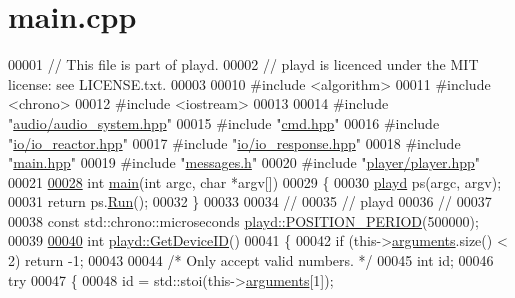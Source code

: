 \hypertarget{main_8cpp_source}{\section{main.\+cpp}
\label{main_8cpp_source}
}

\begin{DoxyCode}
00001 \textcolor{comment}{// This file is part of playd.}
00002 \textcolor{comment}{// playd is licenced under the MIT license: see LICENSE.txt.}
00003 
00010 \textcolor{preprocessor}{#include <algorithm>}
00011 \textcolor{preprocessor}{#include <chrono>}
00012 \textcolor{preprocessor}{#include <iostream>}
00013 
00014 \textcolor{preprocessor}{#include "\hyperlink{audio__system_8hpp}{audio/audio\_system.hpp}"}
00015 \textcolor{preprocessor}{#include "\hyperlink{cmd_8hpp}{cmd.hpp}"}
00016 \textcolor{preprocessor}{#include "\hyperlink{io__reactor_8hpp}{io/io\_reactor.hpp}"}
00017 \textcolor{preprocessor}{#include "\hyperlink{io__response_8hpp}{io/io\_response.hpp}"}
00018 \textcolor{preprocessor}{#include "\hyperlink{main_8hpp}{main.hpp}"}
00019 \textcolor{preprocessor}{#include "\hyperlink{messages_8h}{messages.h}"}
00020 \textcolor{preprocessor}{#include "\hyperlink{player_8hpp}{player/player.hpp}"}
00021 
\hypertarget{main_8cpp_source_l00028}{}\hyperlink{main_8cpp_a0ddf1224851353fc92bfbff6f499fa97}{00028} \textcolor{keywordtype}{int} \hyperlink{main_8cpp_a0ddf1224851353fc92bfbff6f499fa97}{main}(\textcolor{keywordtype}{int} argc, \textcolor{keywordtype}{char} *argv[])
00029 \{
00030     \hyperlink{classplayd}{playd} ps(argc, argv);
00031     \textcolor{keywordflow}{return} ps.\hyperlink{classplayd_aee84626965c812db03120ebe3267fcab}{Run}();
00032 \}
00033 
00034 \textcolor{comment}{//}
00035 \textcolor{comment}{// playd}
00036 \textcolor{comment}{//}
00037 
00038 \textcolor{keyword}{const} std::chrono::microseconds \hyperlink{classplayd_a540bcb2dac9488bcb8e593378005bd07}{playd::POSITION\_PERIOD}(500000);
00039 
\hypertarget{main_8cpp_source_l00040}{}\hyperlink{classplayd_a767d029a5d1321e912c1a2a92e8f3c64}{00040} \textcolor{keywordtype}{int} \hyperlink{classplayd_a767d029a5d1321e912c1a2a92e8f3c64}{playd::GetDeviceID}()
00041 \{
00042     \textcolor{keywordflow}{if} (this->\hyperlink{classplayd_a58d45d86bd51dea16f476aae648ff63c}{arguments}.size() < 2) \textcolor{keywordflow}{return} -1;
00043 
00044     \textcolor{comment}{/* Only accept valid numbers. */}
00045     \textcolor{keywordtype}{int} id;
00046     \textcolor{keywordflow}{try}
00047     \{
00048         \textcolor{keywordtype}{id} = std::stoi(this->\hyperlink{classplayd_a58d45d86bd51dea16f476aae648ff63c}{arguments}[1]);

\end{DoxyCode}
